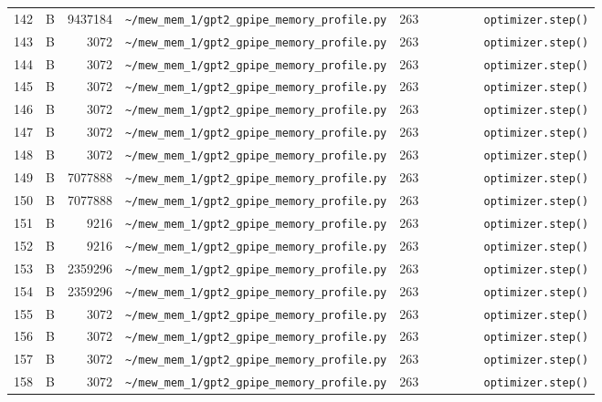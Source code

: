 \documentclass{article}
\begin{document}
\begin{longtable}{r l r p{6.5cm} r p{7.0cm}}
142 & B & 9437184 & \lstinline|~/mew_mem_1/gpt2_gpipe_memory_profile.py| & 263 & \lstinline|        optimizer.step()| \\
143 & B & 3072 & \lstinline|~/mew_mem_1/gpt2_gpipe_memory_profile.py| & 263 & \lstinline|        optimizer.step()| \\
144 & B & 3072 & \lstinline|~/mew_mem_1/gpt2_gpipe_memory_profile.py| & 263 & \lstinline|        optimizer.step()| \\
145 & B & 3072 & \lstinline|~/mew_mem_1/gpt2_gpipe_memory_profile.py| & 263 & \lstinline|        optimizer.step()| \\
146 & B & 3072 & \lstinline|~/mew_mem_1/gpt2_gpipe_memory_profile.py| & 263 & \lstinline|        optimizer.step()| \\
147 & B & 3072 & \lstinline|~/mew_mem_1/gpt2_gpipe_memory_profile.py| & 263 & \lstinline|        optimizer.step()| \\
148 & B & 3072 & \lstinline|~/mew_mem_1/gpt2_gpipe_memory_profile.py| & 263 & \lstinline|        optimizer.step()| \\
149 & B & 7077888 & \lstinline|~/mew_mem_1/gpt2_gpipe_memory_profile.py| & 263 & \lstinline|        optimizer.step()| \\
150 & B & 7077888 & \lstinline|~/mew_mem_1/gpt2_gpipe_memory_profile.py| & 263 & \lstinline|        optimizer.step()| \\
151 & B & 9216 & \lstinline|~/mew_mem_1/gpt2_gpipe_memory_profile.py| & 263 & \lstinline|        optimizer.step()| \\
152 & B & 9216 & \lstinline|~/mew_mem_1/gpt2_gpipe_memory_profile.py| & 263 & \lstinline|        optimizer.step()| \\
153 & B & 2359296 & \lstinline|~/mew_mem_1/gpt2_gpipe_memory_profile.py| & 263 & \lstinline|        optimizer.step()| \\
154 & B & 2359296 & \lstinline|~/mew_mem_1/gpt2_gpipe_memory_profile.py| & 263 & \lstinline|        optimizer.step()| \\
155 & B & 3072 & \lstinline|~/mew_mem_1/gpt2_gpipe_memory_profile.py| & 263 & \lstinline|        optimizer.step()| \\
156 & B & 3072 & \lstinline|~/mew_mem_1/gpt2_gpipe_memory_profile.py| & 263 & \lstinline|        optimizer.step()| \\
157 & B & 3072 & \lstinline|~/mew_mem_1/gpt2_gpipe_memory_profile.py| & 263 & \lstinline|        optimizer.step()| \\
158 & B & 3072 & \lstinline|~/mew_mem_1/gpt2_gpipe_memory_profile.py| & 263 & \lstinline|        optimizer.step()| \\

\end{longtable}
\end{document}
